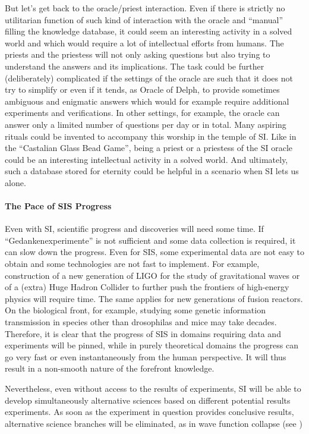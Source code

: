 \documentclass[a4paper,11pt]{article}
\begin{document}
But let's get back to the oracle/priest interaction. Even if there is strictly no utilitarian function of such kind of interaction with the oracle and ``manual'' filling the knowledge database, it could seem an interesting activity in a solved world and which would require a lot of intellectual efforts from humans. The priests and the priestess will not only asking questions but also trying to understand the answers and its implications. The task could be further (deliberately) complicated if the settings of the oracle are such that it does not try to simplify or even if it tends, as Oracle of Delph, to provide sometimes ambiguous and enigmatic answers which would for example require additional experiments and verifications. In other settings, for example, the oracle can answer only a limited number of questions per day or in total. Many aspiring rituals could be invented to accompany this worship in the temple of SI. Like in the ``Castalian Glass Bead Game'', being a priest or a priestess of the SI oracle could be an interesting intellectual activity in a solved world. And ultimately, such a database stored for eternity could be helpful in a scenario when SI lets us alone.

\paragraph{The Pace of SIS Progress}
Even with SI, scientific progress and discoveries will need some time. If ``Gedankenexperimente'' is not sufficient and some data collection is required, it can slow down the progress. Even for SIS, some experimental data are not easy to obtain and some technologies are not fast to implement. For example, construction of a new generation of LIGO for the study of gravitational waves  or of a (extra) Huge Hadron Collider to further push the frontiers of high-energy physics will require time. The same applies for new generations of fusion reactors. On the biological front, for example, studying some genetic information transmission in species other than drosophilas and mice may take decades. Therefore, it is clear that the progress of SIS in domains requiring data and experiments will be pinned, while in purely theoretical domains the progress can go very fast or even instantaneously from the human perspective. It will thus result in a non-smooth nature of the forefront knowledge. 

Nevertheless, even without access to the results of experiments, SI will be able to develop simultaneously alternative sciences based on different potential results experiments. As soon as the experiment in question provides conclusive results, alternative science branches will be eliminated, as in wave function collapse (see )
\end{document}
